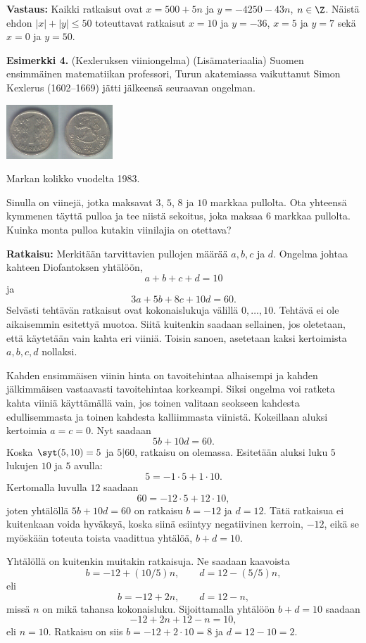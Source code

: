 {\bf Vastaus:} Kaikki ratkaisut ovat  $x=500+5n$ ja $y=-4250-43n$, $n\in\Z$. Näistä ehdon $|x|+|y|\le 50$ toteuttavat ratkaisut $x = 10$ ja $y = -36$, $x = 5$ ja $y = 7$ sekä $x = 0$ ja $y = 50$.

{\bf Esimerkki 4.} (Kexleruksen viiniongelma)
(Lisämateriaalia)
Suomen ensimmäinen matematiikan professori, Turun
akatemiassa vaikuttanut Simon Kexlerus (1602--1669) jätti
jälkeensä seuraavan ongelman.

\begin{center}
\includegraphics[width=4cm]{kuvat/wikimarkka.jpg} %

Markan kolikko vuodelta 1983.
\end{center}

Sinulla on viinejä, jotka maksavat $3$, $5$, $8$ ja $10$
markkaa pullolta. Ota yhteensä kymmenen täyttä pulloa ja
tee niistä sekoitus, joka maksaa $6$ markkaa pullolta.
Kuinka monta pulloa kutakin viinilajia on otettava?

{\bf Ratkaisu:} Merkitään tarvittavien pullojen määrää
$a,b,c$ ja $d$. Ongelma johtaa kahteen Diofantoksen
yhtälöön,
\[
a+b+c+d = 10
\]
ja
\[
3a+5b+8c+10d = 60.
\]
Selvästi tehtävän ratkaisut ovat kokonaislukuja välillä
$0,\ldots,10$. Tehtävä ei ole aikaisemmin esitettyä
muotoa. Siitä kuitenkin saadaan sellainen, jos oletetaan,
että käytetään vain kahta eri viiniä. Toisin sanoen,
asetetaan kaksi kertoimista $a,b,c,d$ nollaksi.

Kahden ensimmäisen viinin hinta on tavoitehintaa
alhaisempi ja kahden jälkimmäisen vastaavasti
tavoitehintaa korkeampi. Siksi ongelma voi ratketa kahta
viiniä käyttämällä vain, jos toinen valitaan seokseen
kahdesta edullisemmasta ja toinen kahdesta kalliimmasta
viinistä. Kokeillaan aluksi kertoimia $a=c=0$. Nyt
saadaan
\[
5b + 10d = 60.
\]
Koska $\syt(5,10)=5$ ja $5|60$, ratkaisu on olemassa.
Esitetään aluksi luku $5$ lukujen $10$ ja $5$ avulla:
\[
5 = -1 \cdot 5 + 1\cdot 10.
\]
Kertomalla luvulla $12$ saadaan
\[
60 = -12\cdot 5 + 12\cdot 10,
\]
joten yhtälöllä $5b+10d=60$ on ratkaisu $b=-12$ ja $d=12$. Tätä ratkaisua ei kuitenkaan voida hyväksyä, koska siinä esiintyy negatiivinen kerroin, $-12$, eikä se myöskään toteuta toista vaadittua yhtälöä, $b+d=10$.

Yhtälöllä on kuitenkin muitakin ratkaisuja. Ne saadaan
kaavoista
\[
b= -12 + (10/5)n, \qquad d=12 - (5/5)n,
\]
eli
\[
b= -12 + 2n, \qquad d=12 - n,
\]
missä $n$ on mikä tahansa kokonaisluku. Sijoittamalla
yhtälöön $b+d=10$ saadaan
\[
-12 + 2n + 12 - n = 10,
\]
eli $n=10$. Ratkaisu on siis $b=-12+2 \cdot 10=8$ ja
$d=12-10=2$.

